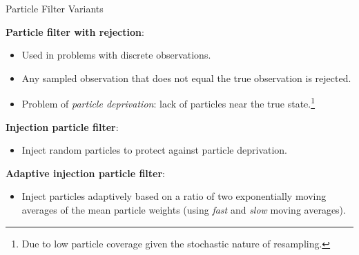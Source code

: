\begin{frame}[fragile]{Particle Filter Variants}

\textbf{Particle filter with rejection}:
\begin{itemize}
    \item Used in problems with discrete observations.
    \item Any sampled observation that does not equal the true observation is rejected.
    \item Problem of \textit{particle deprivation}: lack of particles near the true state.\footnote{Due to low particle coverage given the stochastic nature of resampling.}
\end{itemize}

\vspace{5mm}
\textbf{Injection particle filter}:
\begin{itemize}
    \item Inject random particles to protect against particle deprivation.
\end{itemize}

\vspace{5mm}
\textbf{Adaptive injection particle filter}:
\begin{itemize}
    \item Inject particles adaptively based on a ratio of two exponentially moving averages of the mean particle weights (using \textit{fast} and \textit{slow} moving averages).
\end{itemize}

\end{frame}